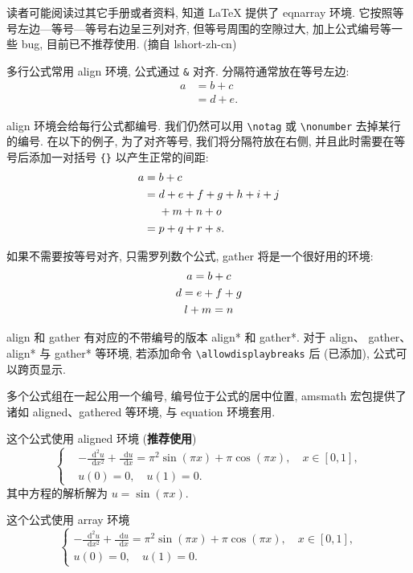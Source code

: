 \documentclass[UTF8,openany,twoside,12pt]{ctexbook}
\theoremstyle{plain}
\newcommand{\dif}{\mathop{}\!\mathrm{d}}
\begin{document}
读者可能阅读过其它手册或者资料, 知道 LaTeX 提供了 eqnarray 环境. 它按照等号左边—等号—等号右边呈三列对齐, 但等号周围的空隙过大, 加上公式编号等一些 bug, 目前已不推荐使用. (摘自 lshort-zh-cn)

多行公式常用 align 环境, 公式通过 \verb|&| 对齐. 分隔符通常放在等号左边:
\begin{align}
a & = b + c \\
& = d + e.
\end{align}

align 环境会给每行公式都编号. 我们仍然可以用 \verb|\notag| 或 \verb|\nonumber| 去掉某行的编号. 在以下的例子,
为了对齐等号, 我们将分隔符放在右侧, 并且此时需要在等号后添加一对括号 \verb|{}| 以产生正常的间距:
\begin{align}
a ={} & b + c \\
={} & d + e + f + g + h + i + j \notag \\
& + m + n + o \\
={} & p + q + r + s.
\end{align}

如果不需要按等号对齐, 只需罗列数个公式, gather 将是一个很好用的环境:
\begin{gather}
a = b + c \\
d = e + f + g \notag \\
l + m = n
\end{gather}

align 和 gather 有对应的不带编号的版本 align* 和 gather*.
对于 align、 gather、align* 与 gather* 等环境, 若添加命令 \verb|\allowdisplaybreaks| 后 (已添加), 公式可以跨页显示.

多个公式组在一起公用一个编号, 编号位于公式的居中位置, amsmath 宏包提供了诸如 aligned、gathered 等环境, 与 equation 环境套用.

这个公式使用 aligned 环境 (\textbf{推荐使用})
\begin{equation}\label{eq:alignedEq}
\left\{\begin{aligned}
  &-\frac{{\dif}^{2} u}{\dif x^{2}}+\frac{\dif u}{\dif x}=\pi^{2} \sin (\pi x)+\pi \cos (\pi x),\quad x \in [0,1], \\
  &u(0)=0,\quad u(1)=0.
\end{aligned} \right.
\end{equation}
其中方程的解析解为 $u=\sin(\pi x)$.

这个公式使用 array 环境
\begin{equation}\label{eq:arrayEq}
\left\{\begin{array}{l}
\displaystyle
-\frac{{\dif}^{2} u}{\dif x^{2}}+\frac{\dif u}{\dif x}=\pi^{2} \sin (\pi x)+\pi \cos (\pi x),\quad x \in [0,1], \\[6pt]
u(0)=0,\quad u(1)=0.
\end{array} \right.
\end{equation}
\end{document}
